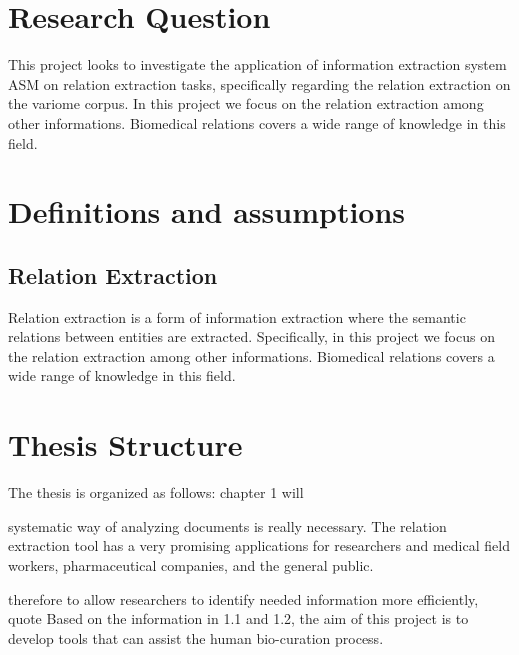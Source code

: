 \section{Research Question}\label{section1.2}%
This project looks to investigate the application of information extraction system ASM on relation extraction tasks, specifically regarding the relation extraction on the variome corpus.
In this project we focus on the relation extraction among other informations. Biomedical relations covers a wide range of knowledge in this field.




\section{Definitions and assumptions}

\subsection{Relation Extraction} 
Relation extraction is a form of information extraction where the semantic relations between entities are extracted.
Specifically, in this project we focus on the relation extraction among other informations. Biomedical relations covers a wide range of knowledge in this field.


\section{Thesis Structure}\label{section1.3} %
The thesis is organized as follows: chapter 1 will






systematic way of analyzing documents is really necessary. The relation extraction tool has a very promising applications for researchers and medical field workers, pharmaceutical companies, and the general public. 




therefore to allow researchers to identify
needed information more efficiently, quote
Based on the information in 1.1 and 1.2, the aim of this project is to develop tools that can assist the human bio-curation process.

